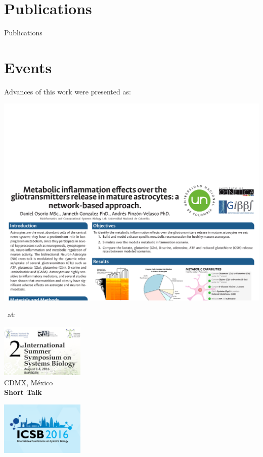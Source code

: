 \documentclass[11pt]{beamer}
\begin{document}
\section{Publications}
\begin{frame}{Publications}
\begin{center}

\end{center}
\end{frame}
\section{Events}
\begin{frame}{Advances of this work were presented as:}
\begin{center}
\includegraphics[width=\textwidth]{Events}
\end{center}
\hrulefill \ at: \hrulefill
\begin{multicols}{3}
\begin{center}
\includegraphics[width=0.3\textwidth]{IS3B}\\
CDMX, México\\
\textbf{Short Talk}
\end{center}
\begin{center}
\includegraphics[width=0.3\textwidth]{ICSB}\\

\end{center}
\end{multicols}
\end{frame}
\end{document}
